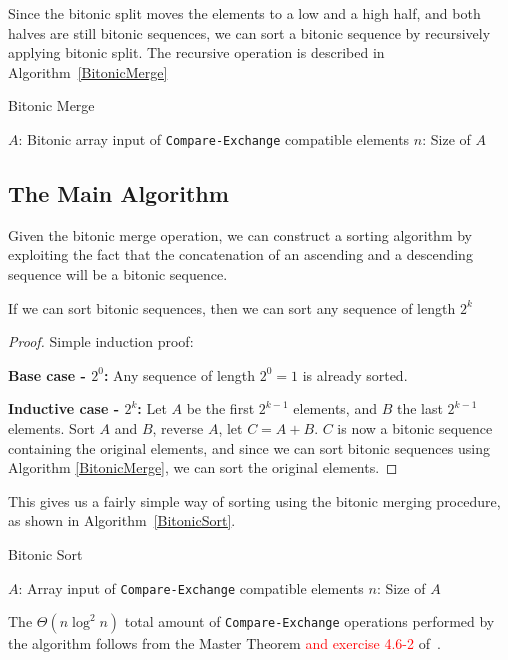 Since the bitonic split moves the elements to a low and a high half, and both halves are still bitonic sequences, we can sort a bitonic sequence by recursively applying bitonic split. The recursive operation is described in Algorithm~\ref{BitonicMerge}

\begin{algorithm}
\caption{Bitonic Merge}\label{BitonicMerge}
\begin{algorithmic}[1]
	\Statex $A$: Bitonic array input of \texttt{Compare-Exchange} compatible elements
	\Statex $n$: Size of $A$
	\EndFor
\EndIf
\EndProcedure
\end{algorithmic}
\end{algorithm}

\subsection{The Main Algorithm}

Given the bitonic merge operation, we can construct a sorting algorithm by exploiting the fact that the concatenation of an ascending and a descending sequence will be a bitonic sequence.

\begin{thm}
If we can sort bitonic sequences, then we can sort any sequence of length $2^k$
\end{thm}

\begin{proof}
Simple induction proof:

\textbf{Base case - $2^0$:} Any sequence of length $2^0 = 1$ is already sorted.

\textbf{Inductive case - $2^k$:} Let $A$ be the first $2^{k-1}$ elements, and $B$ the last $2^{k-1}$ elements. Sort $A$ and $B$, reverse $A$, let $C = A+B$. $C$ is now a bitonic sequence containing the original elements, and since we can sort bitonic sequences using Algorithm \ref{BitonicMerge}, we can sort the original elements.
\end{proof}


This gives us a fairly simple way of sorting using the bitonic merging procedure, as shown in Algorithm~\ref{BitonicSort}.

\begin{algorithm}
\caption{Bitonic Sort}\label{BitonicSort}
\begin{algorithmic}[1]
	\Statex $A$: Array input of \texttt{Compare-Exchange} compatible elements
	\Statex $n$: Size of $A$
\EndIf
\EndProcedure
\end{algorithmic}
\end{algorithm}

The $\Theta(n \log^2 n)$ total amount of \texttt{Compare-Exchange} operations performed by the algorithm follows from the Master Theorem \textcolor{red}{and exercise 4.6-2} of~.




